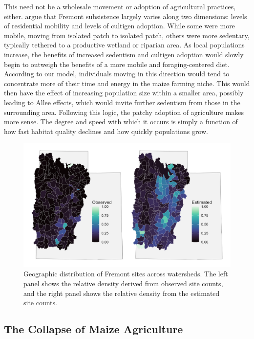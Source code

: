 \documentclass[
  number,
  preprint,
  3p]{elsarticle}
\begin{document}
This need not be a wholesale movement or adoption of agricultural
practices, either. \citep{madsen1998} argue that Fremont subsistence
largely varies along two dimensions: levels of residential mobility and
levels of cultigen adoption. While some were more mobile, moving from
isolated patch to isolated patch, others were more sedentary, typically
tethered to a productive wetland or riparian area. As local populations
increase, the benefits of increased sedentism and cultigen adoption
would slowly begin to outweigh the benefits of a more mobile and
foraging-centered diet. According to our model, individuals moving in
this direction would tend to concentrate more of their time and energy
in the maize farming niche. This would then have the effect of
increasing population size within a smaller area, possibly leading to
Allee effects, which would invite further sedentism from those in the
surrounding area. Following this logic, the patchy adoption of
agriculture makes more sense. The degree and speed with which it occurs
is simply a function of how fast habitat quality declines and how
quickly populations grow.

\begin{figure}

{\centering \includegraphics[width=6in,height=\textheight]{../figures/model-map.png}

}

\caption{\label{fig-model-map}Geographic distribution of Fremont sites
across watersheds. The left panel shows the relative density derived
from observed site counts, and the right panel shows the relative
density from the estimated site counts.}

\end{figure}

\hypertarget{the-collapse-of-maize-agriculture}{%
\subsection{The Collapse of Maize
Agriculture}\label{the-collapse-of-maize-agriculture}}
\end{document}
